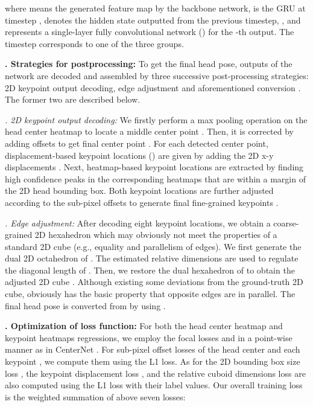 \documentclass{article}
\begin{document}
where  means the generated feature map by the backbone network,  is the GRU at timestep ,  denotes the hidden state outputted from the previous timestep, , and  represents a single-layer fully convolutional network () for the -th output. The timestep  corresponds to one of the three groups.


{\bf {}. Strategies for postprocessing:} 
To get the final head pose, outputs of the network are decoded and assembled by three successive post-processing strategies: 2D keypoint output decoding, edge adjustment and aforementioned conversion . The former two are described below.

{\it {}. 2D keypoint output decoding:}
We firstly perform a  max pooling operation on the head center heatmap to locate a middle center point . Then, it is corrected by adding offsets  to get final center point . For each detected center point, displacement-based keypoint locations  () are given by adding the 2D x-y displacements . Next, heatmap-based keypoint locations  are extracted by finding high confidence peaks in the corresponding heatmaps that are within a margin of the 2D head bounding box. Both keypoint locations are further adjusted according to the sub-pixel offsets  to generate final fine-grained keypoints .

{\it {}. Edge adjustment:}
After decoding eight keypoint locations, we obtain a coarse-grained 2D hexahedron  which may obviously not meet the properties of a standard 2D cube (e.g., equality and parallelism of edges). We first generate the dual 2D octahedron  of . The estimated relative dimensions are used to regulate the diagonal length of . Then, we restore the dual hexahedron of  to obtain the adjusted 2D cube . Although existing some deviations from the ground-truth 2D cube,  obviously has the basic property that opposite edges are in parallel. The final head pose is converted from  by using .


{\bf {}. Optimization of loss function:}
For both the head center heatmap and keypoint heatmaps regressions, we employ the focal losses \cite{lin2017focal}  and  in a point-wise manner as in CenterNet \cite{zhou2019objects}. For sub-pixel offset losses of the head center  and each keypoint , we compute them using the L1 loss. As for the 2D bounding box size loss , the keypoint displacement loss , and the relative cuboid dimensions loss  are also computed using the L1 loss with their label values. Our overall training loss  is the weighted summation of above seven losses:
\end{document}
